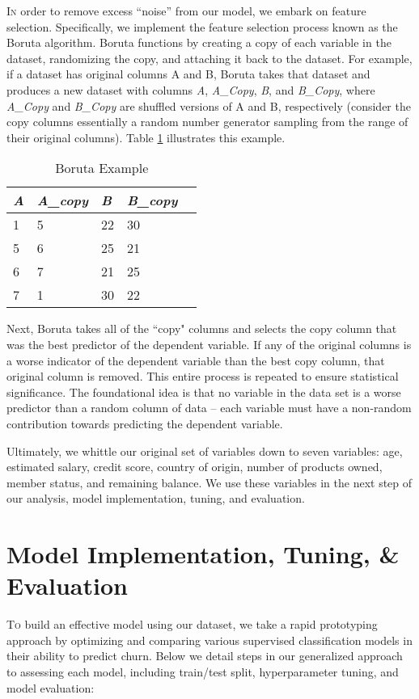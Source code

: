 \documentclass[twoside,twocolumn]{article}
\begin{document}
\lettrine[nindent=0em,lines=2]{I} n order to remove excess “noise” 
from our model, we embark on feature selection. 
Specifically, we implement the feature selection process known as the Boruta algorithm. 
Boruta functions by creating a copy of each variable in the dataset, randomizing the copy, and attaching it back to the dataset. 
For example, if a dataset has original columns A and B, Boruta takes that dataset and produces a new dataset with columns \textit{A}, \textit{A\_Copy}, \textit{B}, and \textit{B\_Copy}, where \textit{A\_Copy} and \textit{B\_Copy} are shuffled versions of A and B, respectively (consider the copy columns essentially a random number generator sampling from the range of their original columns). 
Table \ref{table:boruta} illustrates this example.
\begin{table}
  \centering
  \caption{Boruta Example}
  \begin{tabular}{lllll}
  \toprule
   \textit{A} &  \textit{A\_copy} &  \textit{B} &  \textit{B\_copy} \\
  \midrule
   1 &       5 & 22 &      30 \\
   5 &       6 & 25 &      21 \\
   6 &       7 & 21 &      25 \\
   7 &       1 & 30 &      22 \\
  \bottomrule
  \end{tabular}
  \label{table:boruta}
  \end{table}
  
Next, Boruta takes all of the ``copy" columns and selects the copy column that was the best predictor of the dependent variable. 
If any of the original columns is a worse indicator of the dependent variable than the best copy column, 
that original column is removed. This entire process is repeated to ensure statistical significance. 
The foundational idea is that no variable in the data set is a worse predictor than a random column of data – each variable must have a non-random contribution towards predicting the dependent variable.

Ultimately, we whittle our original set of variables down to seven variables: age, estimated salary,  credit score, country of origin, number of products owned, member status, and remaining balance. We use these variables in the next step of our analysis, model implementation, tuning, and evaluation.


\section{Model Implementation, Tuning, \& Evaluation}
\lettrine[nindent=0em,lines=2]{T}o build an effective model using our dataset, we take a rapid prototyping approach by optimizing and comparing various supervised classification models in their ability to predict churn. Below we detail steps in our generalized approach to assessing each model, including train/test split, hyperparameter tuning, and model evaluation:
\end{document}

